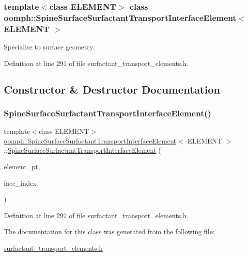 \subsubsection*{template$<$class E\+L\+E\+M\+E\+NT$>$\newline
class oomph\+::\+Spine\+Surface\+Surfactant\+Transport\+Interface\+Element$<$ E\+L\+E\+M\+E\+N\+T $>$}

Specialise to surface geometry. 

Definition at line 291 of file surfactant\+\_\+transport\+\_\+elements.\+h.



\subsection{Constructor \& Destructor Documentation}
\mbox{\label{classoomph_1_1SpineSurfaceSurfactantTransportInterfaceElement_aa3014e796ec7e0bfa26824fc42184d06}} 
\subsubsection{\texorpdfstring{Spine\+Surface\+Surfactant\+Transport\+Interface\+Element()}{SpineSurfaceSurfactantTransportInterfaceElement()}}
{\footnotesize\ttfamily template$<$class E\+L\+E\+M\+E\+NT$>$ \\
\hyperlink{classoomph_1_1SpineSurfaceSurfactantTransportInterfaceElement}{oomph\+::\+Spine\+Surface\+Surfactant\+Transport\+Interface\+Element}$<$ E\+L\+E\+M\+E\+NT $>$\+::\hyperlink{classoomph_1_1SpineSurfaceSurfactantTransportInterfaceElement}{Spine\+Surface\+Surfactant\+Transport\+Interface\+Element} (\begin{DoxyParamCaption}\item[{Finite\+Element $\ast$const \&}]{element\+\_\+pt,  }\item[{const int \&}]{face\+\_\+index }\end{DoxyParamCaption})\hspace{0.3cm}{\ttfamily [inline]}}



Definition at line 297 of file surfactant\+\_\+transport\+\_\+elements.\+h.



The documentation for this class was generated from the following file\+:\begin{DoxyCompactItemize}
\item 
\hyperlink{surfactant__transport__elements_8h}{surfactant\+\_\+transport\+\_\+elements.\+h}\end{DoxyCompactItemize}
